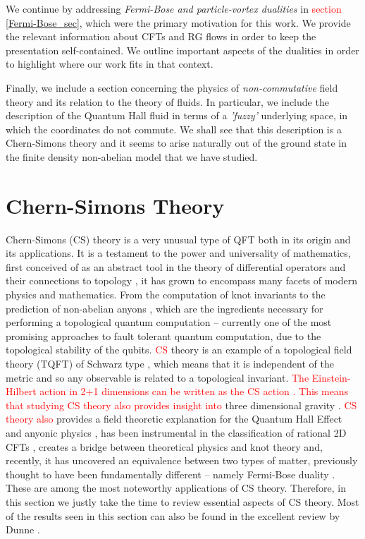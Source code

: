     We continue by addressing \textit{Fermi-Bose and particle-vortex dualities} in \textcolor{red}{section} \ref{Fermi-Bose_sec}, which were the primary motivation for this work. We provide the relevant information about CFTs and RG flows in order to keep the presentation self-contained. We outline important aspects of the dualities in order to highlight where our work fits in that context.

    Finally, we include a section concerning the physics of \textit{non-commutative} field theory and its relation to the theory of fluids. In particular, we include the description of the Quantum Hall fluid in terms of a \textit{'fuzzy'} underlying space, in which the coordinates do not commute. We shall see that this description is a Chern-Simons theory and it seems to arise naturally out of the ground state in the finite density non-abelian model that we have studied.

        \section{Chern-Simons Theory} \label{CS_sec}
    Chern-Simons (CS) theory is a very unusual type of QFT both in its origin and its applications. It is a testament to the power and universality of mathematics, first conceived of as an abstract tool in the theory of differential operators and their connections to topology \cite{Chern:1974ft}, it has grown to encompass many facets of modern physics and mathematics. From the computation of knot invariants \cite{Witten:1988hf} to the prediction of non-abelian anyons \cite{Moore:1991ks}, which are the ingredients necessary for performing a topological quantum computation \cite{RevModPhys.80.1083} -- currently one of the most promising approaches to fault tolerant quantum computation, due to the topological stability of the qubits. \textcolor{red}{CS} theory is an example of a topological field theory (TQFT) of Schwarz type \cite{Schwarz:2000ct}, which means that it is independent of the metric and so any observable is related to a topological invariant. \textcolor{red}{The Einstein-Hilbert action in 2+1 dimensions can be written as the CS action \cite{Achucarro:1987vz}. This means that studying CS theory also provides insight into} three dimensional gravity \cite{Carlip:2005zn, Deser:1982vy, Witten:2007kt}. \textcolor{red}{CS theory also} provides a field theoretic explanation for the Quantum Hall Effect and anyonic physics \cite{Zee, Tong:2016kpv}, has been instrumental in the classification of rational 2D CFTs \cite{Moore:1989yh}, creates a bridge between theoretical physics and knot theory \cite{Witten:1988hf} and, recently, it has uncovered an equivalence between two types of matter, previously thought to have been fundamentally different -- namely Fermi-Bose duality \cite{Aharony:2015mjs} \cite{Aharony:2012nh, Giombi:2011kc, Aharony:2011jz, Giveon:2008zn}. These are among the most noteworthy applications of CS theory. Therefore, in this section we justly take the time to review essential aspects of CS theory. Most of the results seen in this section can also be found in the excellent review by Dunne \cite{Dunne:1998qy}.

